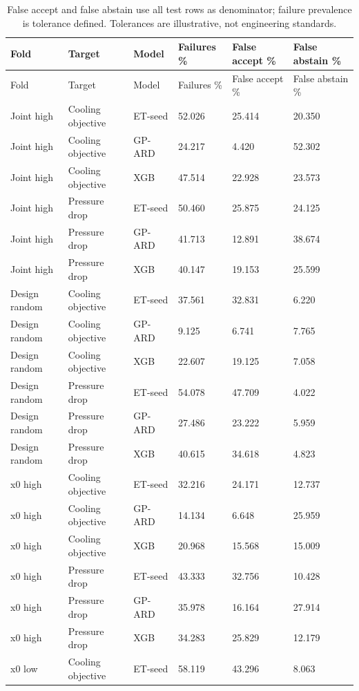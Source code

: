 \begingroup\small\setlength{\tabcolsep}{3pt}\begin{longtable}{llllll}
\caption{False accept and false abstain use all test rows as denominator; failure prevalence is tolerance defined. Tolerances are illustrative, not engineering standards.}\label{tab:ubend-false_decisions}\\\toprule
Fold & Target & Model & Failures \% & False accept \% & False abstain \%\\\midrule
\endfirsthead\toprule
Fold & Target & Model & Failures \% & False accept \% & False abstain \%\\\midrule
\endhead
Joint high & Cooling objective & ET-seed & 52.026 & 25.414 & 20.350\\
Joint high & Cooling objective & GP-ARD & 24.217 & 4.420 & 52.302\\
Joint high & Cooling objective & XGB & 47.514 & 22.928 & 23.573\\
Joint high & Pressure drop & ET-seed & 50.460 & 25.875 & 24.125\\
Joint high & Pressure drop & GP-ARD & 41.713 & 12.891 & 38.674\\
Joint high & Pressure drop & XGB & 40.147 & 19.153 & 25.599\\
Design random & Cooling objective & ET-seed & 37.561 & 32.831 & 6.220\\
Design random & Cooling objective & GP-ARD & 9.125 & 6.741 & 7.765\\
Design random & Cooling objective & XGB & 22.607 & 19.125 & 7.058\\
Design random & Pressure drop & ET-seed & 54.078 & 47.709 & 4.022\\
Design random & Pressure drop & GP-ARD & 27.486 & 23.222 & 5.959\\
Design random & Pressure drop & XGB & 40.615 & 34.618 & 4.823\\
x0 high & Cooling objective & ET-seed & 32.216 & 24.171 & 12.737\\
x0 high & Cooling objective & GP-ARD & 14.134 & 6.648 & 25.959\\
x0 high & Cooling objective & XGB & 20.968 & 15.568 & 15.009\\
x0 high & Pressure drop & ET-seed & 43.333 & 32.756 & 10.428\\
x0 high & Pressure drop & GP-ARD & 35.978 & 16.164 & 27.914\\
x0 high & Pressure drop & XGB & 34.283 & 25.829 & 12.179\\
x0 low & Cooling objective & ET-seed & 58.119 & 43.296 & 8.063\\

\end{longtable}
